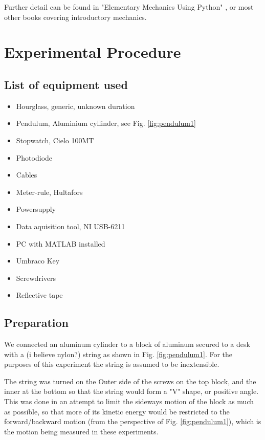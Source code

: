 \documentclass[%
 reprint,
 amsmath,amssymb,
 aps,
]{revtex4-1}
\begin{document}
	Further detail can be found in "Elementary Mechanics Using Python" \cite{elempy}, or most other books covering introductory mechanics.

\section{\label{section:experimentalproced}Experimental Procedure}
    
    \subsection{List of equipment used}
    \begin{itemize}
        \item Hourglass, generic, unknown duration
        \item Pendulum, Aluminium cyllinder, see Fig. \ref{fig:pendulum1}
        \item Stopwatch, Cielo 100MT
        \item Photodiode
        \item Cables
        \item Meter-rule, Hultafors
        \item Powersupply
        \item Data aquisition tool, NI USB-6211
        \item PC with MATLAB installed
        \item Umbraco Key
        \item Screwdrivers
        \item Reflective tape
    \end{itemize}

    \subsection{Preparation}
        We connected an aluminum cylinder to a block of aluminum secured to a desk with a (i believe nylon?) string as shown in Fig. \ref{fig:pendulum1}. For the purposes of this experiment the string is assumed to be inextensible. 

        The string was turned on the Outer side of the screws on the top block, and the inner at the bottom so that the string would form a "V" shape, or positive angle. This was done in an attempt to limit the sideways motion of the block as much as possible, so that more of its kinetic energy would be restricted to the forward/backward motion (from the perspective of Fig. \ref{fig:pendulum1}), which is the motion being measured in these experiments.
\end{document}
